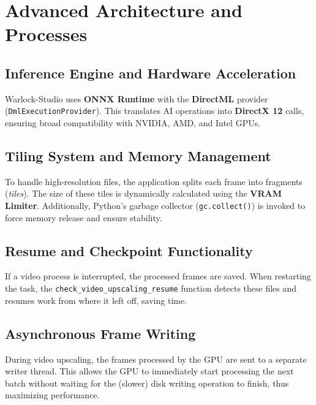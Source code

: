 \documentclass[11pt, a4paper]{article}
\newcommand{\inlinecode}[1]{\colorbox{WarlockLightGray}{\small\texttt{#1}}}
\begin{document}
\section{Advanced Architecture and Processes}

\subsection{Inference Engine and Hardware Acceleration}
Warlock-Studio uses \textbf{ONNX Runtime} with the \textbf{DirectML} provider (\inlinecode{DmlExecutionProvider}). This translates AI operations into \textbf{DirectX 12} calls, ensuring broad compatibility with NVIDIA, AMD, and Intel GPUs.

\subsection{Tiling System and Memory Management}
To handle high-resolution files, the application splits each frame into fragments (\textit{tiles}). The size of these tiles is dynamically calculated using the \textbf{VRAM Limiter}. Additionally, Python's garbage collector (\inlinecode{gc.collect()}) is invoked to force memory release and ensure stability.

\subsection{Resume and Checkpoint Functionality}
If a video process is interrupted, the processed frames are saved. When restarting the task, the \inlinecode{check\_video\_upscaling\_resume} function detects these files and resumes work from where it left off, saving time.

\subsection{Asynchronous Frame Writing}
During video upscaling, the frames processed by the GPU are sent to a separate writer thread. This allows the GPU to immediately start processing the next batch without waiting for the (slower) disk writing operation to finish, thus maximizing performance.


\end{document}

